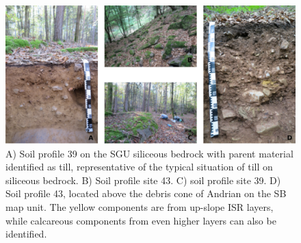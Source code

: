 \documentclass[preprint,12pt,authoryear]{elsarticle}
\begin{document}
 \begin{figure}[ht!]
\includegraphics[width=\textwidth,angle=0]{soils_red.pdf}
\caption{A) Soil profile 39 on the SGU siliceous bedrock with parent material identified as till, representative of the typical situation of till on siliceous bedrock. B) Soil profile site 43.  C) soil profile site 39. D) Soil profile 43, located above the debris cone of Andrian on the SB map unit. The yellow components are from up-slope ISR layers, while calcareous components from even higher layers can also be identified.}
\label{fig:soils}
\end{figure}
\end{document}
